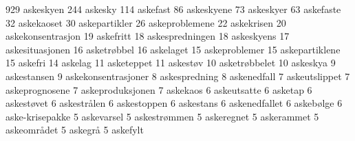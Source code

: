 929 askeskyen
244 askesky
114 askefast
86 askeskyene
73 askeskyer
63 askefaste
32 askekaoset
30 askepartikler
26 askeproblemene
22 askekrisen
20 askekonsentrasjon
19 askefritt
18 askespredningen
18 askeskyens
17 askesituasjonen
16 asketrøbbel
16 askelaget
15 askeproblemer
15 askepartiklene
15 askefri
14 askelag
11 asketeppet
11 askestøv
10 asketrøbbelet
10 askeskya
9 askestansen
9 askekonsentrasjoner
8 askespredning
8 askenedfall
7 askeutslippet
7 askeprognosene
7 askeproduksjonen
7 askekaos
6 askeutsatte
6 asketap
6 askestøvet
6 askestrålen
6 askestoppen
6 askestans
6 askenedfallet
6 askebølge
6 aske-krisepakke
5 askevarsel
5 askestrømmen
5 askeregnet
5 askerammet
5 askeområdet
5 askegrå
5 askefylt